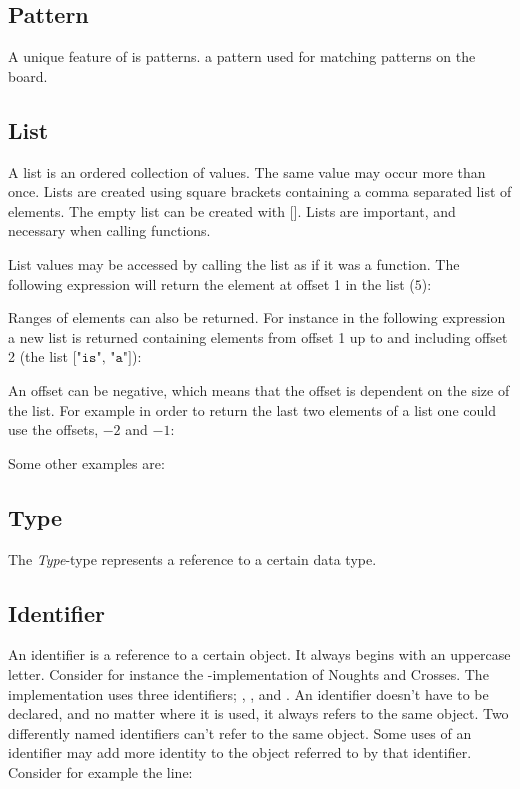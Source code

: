 \subsection{Pattern}
A unique feature of \productname{} is patterns.
a pattern used for matching patterns on the board.

\subsection{List}
A list is an ordered collection of values. The same value may occur more than once. Lists are created using square brackets containing a comma separated list of elements. The empty list can be created with $\texttt{[]}$. Lists are important, and necessary when calling functions.

List values may be accessed by calling the list as if it was a function.
The following expression will return the element at offset 1 in the list
($5$):


Ranges of elements can also be returned. For instance in the following
expression a new list is returned containing elements from offset 1 up
to and including offset 2 (the list $\texttt{["is", "a"]}$):


An offset can be negative, which means that the offset is dependent on
the size of the list. For example in order to return the last two elements
of a list one could use the offsets, $-2$ and $-1$:


Some other examples are:


\subsection{Type}
The \emph{Type}-type represents a reference to a certain data type.

\subsection{Identifier}
An identifier is a reference to a certain object. It always begins with an uppercase letter.
Consider for instance the \productname-implementation
of Noughts and Crosses. The implementation uses three identifiers; ,
, and . An identifier doesn't have to be declared, and no matter
where it is used, it always refers to the same object. Two differently named identifiers can't refer
to the same object. Some uses of an identifier may add more identity to the object referred to by that
identifier. Consider for example the line:

